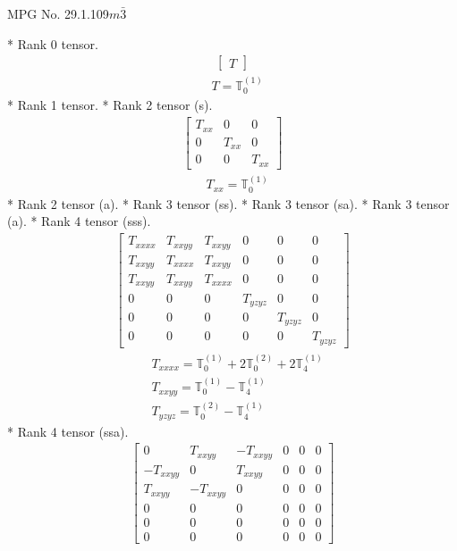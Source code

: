 \documentclass[fleqn,8pt,landscape]{jsarticle}
\begin{document}
\setcounter{MaxMatrixCols}{32}

\renewcommand{\tablename}{Table~}
\renewcommand{\figurename}{Figure~}
\begin{center}
\LARGE
MPG No. 29.1.109\quad$m\bar{3}$
\end{center}
* Rank 0 tensor.
\begin{align*}
\begin{bmatrix} T \end{bmatrix}
\end{align*}
\begin{align*}
& T = \mathbb{T}_{0}^{(1)}
\end{align*}
* Rank 1 tensor.
* Rank 2 tensor (s).
\begin{align*}
\begin{bmatrix} T_{xx} & 0 & 0 \\ 0 & T_{xx} & 0 \\ 0 & 0 & T_{xx} \end{bmatrix}
\end{align*}
\begin{align*}
& T_{xx} = \mathbb{T}_{0}^{(1)}
\end{align*}
* Rank 2 tensor (a).
* Rank 3 tensor (ss).
* Rank 3 tensor (sa).
* Rank 3 tensor (a).
* Rank 4 tensor (sss).
\begin{align*}
\begin{bmatrix} T_{xxxx} & T_{xxyy} & T_{xxyy} & 0 & 0 & 0 \\ T_{xxyy} & T_{xxxx} & T_{xxyy} & 0 & 0 & 0 \\ T_{xxyy} & T_{xxyy} & T_{xxxx} & 0 & 0 & 0 \\ 0 & 0 & 0 & T_{yzyz} & 0 & 0 \\ 0 & 0 & 0 & 0 & T_{yzyz} & 0 \\ 0 & 0 & 0 & 0 & 0 & T_{yzyz} \end{bmatrix}
\end{align*}
\begin{align*}
& T_{xxxx} = \mathbb{T}_{0}^{(1)} + 2 \mathbb{T}_{0}^{(2)} + 2 \mathbb{T}_{4}^{(1)} \\
& T_{xxyy} = \mathbb{T}_{0}^{(1)} - \mathbb{T}_{4}^{(1)} \\
& T_{yzyz} = \mathbb{T}_{0}^{(2)} - \mathbb{T}_{4}^{(1)}
\end{align*}
* Rank 4 tensor (ssa).
\begin{align*}
\begin{bmatrix} 0 & T_{xxyy} & - T_{xxyy} & 0 & 0 & 0 \\ - T_{xxyy} & 0 & T_{xxyy} & 0 & 0 & 0 \\ T_{xxyy} & - T_{xxyy} & 0 & 0 & 0 & 0 \\ 0 & 0 & 0 & 0 & 0 & 0 \\ 0 & 0 & 0 & 0 & 0 & 0 \\ 0 & 0 & 0 & 0 & 0 & 0 \end{bmatrix}
\end{align*}
\end{document}
